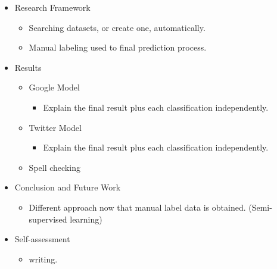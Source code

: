 \begin{itemize}
  \item Research Framework
  \begin{itemize}
    \item Searching datasets, or create one, automatically.
    \item Manual labeling used to final prediction process.
  \end{itemize}

  \item Results
  \begin{itemize}
    \item Google Model
    \begin{itemize}
      \item Explain the final result plus each classification independently.
    \end{itemize}
    \item Twitter Model
    \begin{itemize}
      \item Explain the final result plus each classification independently. 
    \end{itemize}
    \item Spell checking
  \end{itemize}

  \item Conclusion and Future Work
    \begin{itemize}
      \item Different approach now that manual label data is obtained.  (Semi-supervised learning) 
    \end{itemize}
  
  \item Self-assessment
  \begin{itemize}
    \item writing.
  \end{itemize}
\end{itemize}